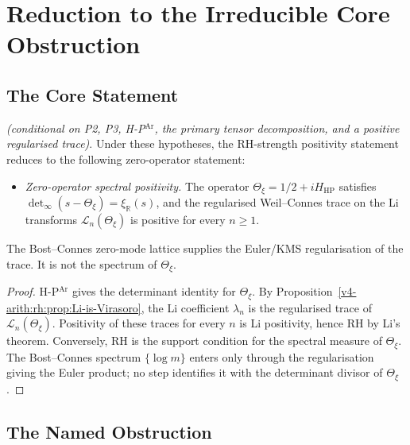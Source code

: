 \section{Reduction to the Irreducible Core Obstruction}
\label{v4-arith:vb:reduction-core}

\subsection{The Core Statement}
\label{v4-arith:vb:core-statement}

\begin{theorem}
\label{v4-arith:vb:thm:reduction}
\emph{(conditional on P2, P3,
H-P\(^{\mathrm{Ar}}\), the primary tensor decomposition, and a positive
regularised trace)}. Under these hypotheses, the RH-strength
positivity statement reduces to the following zero-operator statement:
\begin{itemize}
\item[\textbf{(VB\(^{*}_{\mathrm{core}}\))}] \emph{Zero-operator spectral
positivity.} The operator
\(\Theta_{\xi}=1/2+iH_{\mathrm{HP}}\) satisfies
\(\det_{\infty}(s-\Theta_{\xi})=\xi_{\mathbb R}(s)\), and the
regularised Weil--Connes trace on the Li transforms
\(\mathcal L_n(\Theta_{\xi})\) is positive for every \(n\geq1\).
\end{itemize}
The Bost--Connes zero-mode lattice supplies the Euler/KMS
regularisation of the trace. It is not the spectrum of
\(\Theta_{\xi}\).
\end{theorem}

\begin{proof}
H-P\(^{\mathrm{Ar}}\) gives the determinant identity for
\(\Theta_{\xi}\). By
Proposition~\ref{v4-arith:rh:prop:Li-is-Virasoro}, the Li coefficient
\(\lambda_n\) is the regularised trace of
\(\mathcal L_n(\Theta_{\xi})\). Positivity of these traces for every
\(n\) is Li positivity, hence RH by Li's theorem. Conversely, RH is
the support condition for the spectral measure of \(\Theta_{\xi}\).
The Bost--Connes spectrum \(\{\log m\}\) enters only through the
regularisation giving the Euler product; no step identifies it with
the determinant divisor of \(\Theta_{\xi}\).
\end{proof}

\subsection{The Named Obstruction}
\label{v4-arith:vb:named-obstruction}

